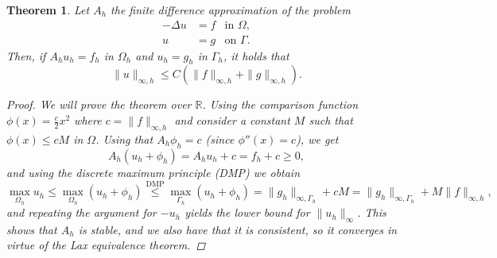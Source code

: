 \documentclass{article}
\newcommand{\R}{\mathbb{R}}
\newcommand{\tin}{\text{in }}
\newcommand{\ton}{\text{on }}
\newtheorem{theorem}{Theorem}
\begin{document}
\begin{theorem}
    Let $A_h$ the finite difference approximation of the problem
    $$\begin{aligned}
        -\Delta u &= f & \tin \Omega, \\
        u &= g & \ton \Gamma.
    \end{aligned}
    $$
    Then, if $A_h u_h = f_h$ in $\Omega_h$ and $u_h = g_h$ in $\Gamma_h$, it holds that
    $$\|u\|_{\infty,h} \leq C\left(\|f\|_{\infty, h} + \|g\|_{\infty, h}\right).$$
    \begin{proof}
        We will prove the theorem over $\R$. Using the comparison function $\phi(x) = \frac{c}{2}x^2$ where $c=\|f\|_{\infty, h}$ and consider a constant $M$ such that $\phi(x) \leq cM$ in $\Omega$. Using that $A_h \phi_h = c$ (since $\phi''(x) = c$), we get
        $$A_h(u_h + \phi_h) = A_h u_h + c = f_h + c \geq 0,$$
        and using the discrete maximum principle (DMP) we obtain
        $$\max_{\Omega_h} u_h \leq \max_{\Omega_h} (u_h + \phi_h) \overset{\text{DMP}}{\leq} \max_{\Gamma_h} (u_h + \phi_h) = \|g_h\|_{\infty, \Gamma_h} + cM = \|g_h\|_{\infty, \Gamma_h} + M \|f\|_{\infty, h},$$
        and repeating the argument for $-u_h$ yields the lower bound for $\|u_h\|_{\infty}$. This shows that $A_h$ is stable, and we also have that it is consistent, so it converges in virtue of the Lax equivalence theorem.
    \end{proof}
\end{theorem}
\end{document}
